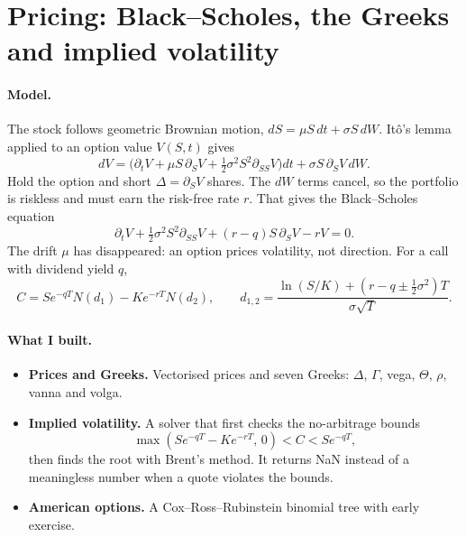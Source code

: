 \documentclass[11pt,a4paper]{article}
\begin{document}
\section{Pricing: Black--Scholes, the Greeks and implied volatility}
\paragraph{Model.} The stock follows geometric Brownian motion, $dS = \mu S\,dt + \sigma S\,dW$. Itô's lemma applied to an option value $V(S,t)$ gives
\begin{equation}
dV = \Big(\partial_t V + \mu S\,\partial_S V + \tfrac12\sigma^2S^2\partial_{SS}V\Big)dt + \sigma S\,\partial_S V\,dW .
\end{equation}
Hold the option and short $\Delta=\partial_S V$ shares. The $dW$ terms cancel, so the portfolio is riskless and must earn the risk-free rate $r$. That gives the Black--Scholes equation
\begin{equation}
\partial_t V + \tfrac12\sigma^2S^2\partial_{SS}V + (r-q)S\,\partial_S V - rV = 0 .
\end{equation}
The drift $\mu$ has disappeared: an option prices volatility, not direction. For a call with dividend yield $q$,
\begin{equation}
C = Se^{-qT}N(d_1) - Ke^{-rT}N(d_2),\qquad d_{1,2} = \frac{\ln(S/K) + (r-q\pm\frac12\sigma^2)T}{\sigma\sqrt T}.
\end{equation}

\paragraph{What I built.}
\begin{itemize}[leftmargin=1.5em]
  \item \textbf{Prices and Greeks.} Vectorised prices and seven Greeks: $\Delta$, $\Gamma$, vega, $\Theta$, $\rho$, vanna and volga.
  \item \textbf{Implied volatility.} A solver that first checks the no-arbitrage bounds
  \[\max(Se^{-qT}-Ke^{-rT},\,0) < C < Se^{-qT},\]
  then finds the root with Brent's method. It returns NaN instead of a meaningless number when a quote violates the bounds.
  \item \textbf{American options.} A Cox--Ross--Rubinstein binomial tree with early exercise.
\end{itemize}
\end{document}

